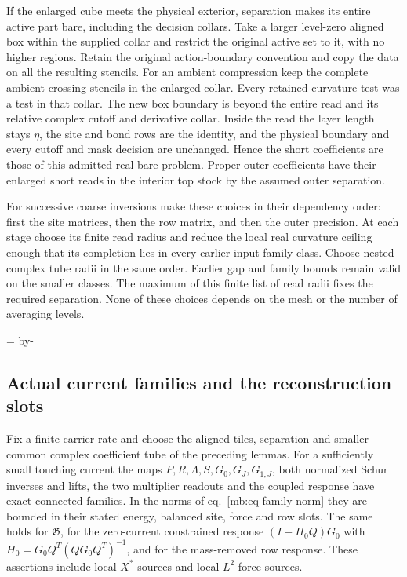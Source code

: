 \documentclass[11pt,letterpaper,reqno]{amsart}
\makeatletter
\numberwithin{equation}{section}
\renewcommand{\eqref}[1]{\textup{eq.~\ref{#1}}}
\newcommand{\mbneedspace}[1]{\par\begingroup
  \dimen0=\pagegoal\advance\dimen0 by-\pagetotal
  \ifdim\dimen0<#1\relax\newpage\fi\endgroup}
\theoremstyle{definition}
\newcommand{\ms@majorstart}{%
  \pushQED{\qed}\renewcommand{\qedsymbol}{$\blacksquare\square$}}
\newenvironment{theorem}[1][]{\ms@majorstart\ms@theorem[#1]}
  {\popQED\endms@theorem}
\theoremstyle{remark}
\makeatother
\begin{document}
If the enlarged cube meets the physical exterior, separation makes
its entire active part bare, including the decision collars. Take a
larger level-zero aligned box within the supplied collar and restrict
the original active set to it, with no higher regions. Retain the
original action-boundary convention and copy the data on all the
resulting stencils. For an ambient compression keep the complete
ambient crossing stencils in the enlarged collar. Every retained
curvature test was a test in that collar. The new box boundary is
beyond the entire read and its relative complex cutoff and derivative
collar. Inside the read the layer length stays
\(\eta\), the site and bond rows are the identity, and the physical
boundary and every cutoff and mask decision are unchanged. Hence the
short coefficients are those of this admitted real bare problem.
Proper outer coefficients have their enlarged short reads in the
interior top stock by the assumed outer separation.

For successive coarse inversions make these choices in their
dependency order: first the site matrices, then the row matrix,
and then the outer precision. At each stage choose its finite
read radius and reduce the local real curvature ceiling enough
that its completion lies in every earlier input family class.
Choose nested complex tube radii in the same order. Earlier
gap and family bounds remain valid on the smaller classes.
The maximum of this finite list of read radii fixes the required
separation. None of these choices depends on the mesh or the
number of averaging levels.

\mbneedspace{10\baselineskip}
\subsection{Actual current families and the reconstruction slots}

\begin{theorem}[Connected coefficients for the named propagators]
\label{mb:thm-current-families}
Fix a finite carrier rate and choose the aligned tiles, separation and smaller common complex coefficient tube of the preceding lemmas. For a sufficiently small touching current the maps \(P,R,\Lambda,S,G_0,G_J,G_{1,J}\), both normalized Schur inverses and lifts, the two multiplier readouts and the coupled response have exact connected families. In the norms of \eqref{mb:eq-family-norm} they are bounded in their stated energy, balanced site, force and row slots. The same holds for \(\mathfrak G\), for the zero-current constrained response \((I-H_{0}Q)G_0\) with \(H_0=G_0Q^T(QG_0Q^T)^{-1}\), and for the mass-removed row response. These assertions include local \(X^*\)-sources and local \(L^2\)-force sources.
\end{theorem}
\end{document}
